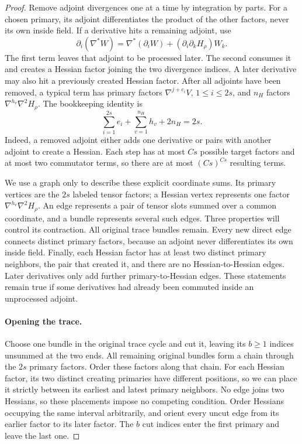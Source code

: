 \begin{proof}
Remove adjoint divergences one at a time by integration by parts.
For a chosen primary, its adjoint differentiates the product of the
other factors, never its own inside field.  If a derivative hits a
remaining adjoint, use
\[
 \partial_i(\nabla^*W)
 =\nabla^*(\partial_iW)
    +(\partial_i\partial_kH_\rho)W_k.
\]
The first term leaves that adjoint to be processed later.  The second
consumes it and creates a Hessian factor joining the two divergence
indices.  A later derivative may also hit a previously created
Hessian factor.  After all adjoints have been removed, a typical term
has primary factors $\nabla^{j+e_i}V$, $1\le i\le2s$, and $n_H$
factors $\nabla^{h_v}\nabla^2H_\rho$.  The bookkeeping identity is
\begin{equation}
 \sum_{i=1}^{2s}e_i+\sum_{v=1}^{n_H}h_v+2n_H=2s.
 \label{eq:network-degree-count}
\end{equation}
Indeed, a removed adjoint either adds one derivative or pairs with
another adjoint to create a Hessian.  Each step has at most $Cs$
possible target factors and at most two commutator terms, so there
are at most $(Cs)^{Cs}$ resulting terms.

We use a graph only to describe these explicit coordinate sums.
Its primary vertices are the $2s$ labeled tensor factors; a Hessian
vertex represents one factor $\nabla^{h_v}\nabla^2H_\rho$.
An edge represents a pair of tensor slots summed over a common
coordinate, and a bundle represents several such edges.
Three properties will control its contraction.  All original trace
bundles remain.  Every new direct edge connects distinct primary
factors, because an adjoint never differentiates its own inside
field.  Finally, each Hessian factor has at least two distinct
primary neighbors, the pair that created it, and there are no
Hessian-to-Hessian edges.  Later derivatives only add further
primary-to-Hessian edges.  These statements remain true if some
derivatives had already been commuted inside an unprocessed adjoint.

\paragraph{Opening the trace.}
Choose one bundle in the original trace cycle and cut it, leaving
its $b\ge1$ indices unsummed at the two ends.  All remaining original
bundles form a chain through the $2s$ primary factors.  Order these
factors along that chain.  For each Hessian factor, its two distinct
creating primaries have different positions, so we can place it
strictly between its earliest and latest primary neighbors.  No edge
joins two Hessians, so these placements impose no competing condition.
Order Hessians occupying the same interval arbitrarily, and orient
every uncut edge from its earlier factor to its later factor.
The $b$ cut indices enter the first primary and leave the last one.


\end{proof}
